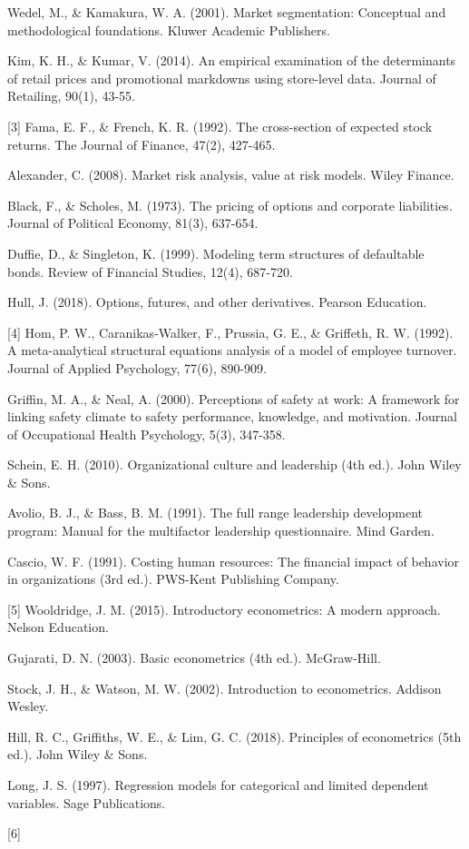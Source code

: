 \documentclass[
  letterpaper,
  DIV=11,
  numbers=noendperiod]{scrreport}
\begin{document}
Wedel, M., \& Kamakura, W. A. (2001). Market segmentation: Conceptual
and methodological foundations. Kluwer Academic Publishers.

Kim, K. H., \& Kumar, V. (2014). An empirical examination of the
determinants of retail prices and promotional markdowns using
store-level data. Journal of Retailing, 90(1), 43-55.

{[}3{]} Fama, E. F., \& French, K. R. (1992). The cross-section of
expected stock returns. The Journal of Finance, 47(2), 427-465.

Alexander, C. (2008). Market risk analysis, value at risk models. Wiley
Finance.

Black, F., \& Scholes, M. (1973). The pricing of options and corporate
liabilities. Journal of Political Economy, 81(3), 637-654.

Duffie, D., \& Singleton, K. (1999). Modeling term structures of
defaultable bonds. Review of Financial Studies, 12(4), 687-720.

Hull, J. (2018). Options, futures, and other derivatives. Pearson
Education.

{[}4{]} Hom, P. W., Caranikas-Walker, F., Prussia, G. E., \& Griffeth,
R. W. (1992). A meta-analytical structural equations analysis of a model
of employee turnover. Journal of Applied Psychology, 77(6), 890-909.

Griffin, M. A., \& Neal, A. (2000). Perceptions of safety at work: A
framework for linking safety climate to safety performance, knowledge,
and motivation. Journal of Occupational Health Psychology, 5(3),
347-358.

Schein, E. H. (2010). Organizational culture and leadership (4th ed.).
John Wiley \& Sons.

Avolio, B. J., \& Bass, B. M. (1991). The full range leadership
development program: Manual for the multifactor leadership
questionnaire. Mind Garden.

Cascio, W. F. (1991). Costing human resources: The financial impact of
behavior in organizations (3rd ed.). PWS-Kent Publishing Company.

{[}5{]} Wooldridge, J. M. (2015). Introductory econometrics: A modern
approach. Nelson Education.

Gujarati, D. N. (2003). Basic econometrics (4th ed.). McGraw-Hill.

Stock, J. H., \& Watson, M. W. (2002). Introduction to econometrics.
Addison Wesley.

Hill, R. C., Griffiths, W. E., \& Lim, G. C. (2018). Principles of
econometrics (5th ed.). John Wiley \& Sons.

Long, J. S. (1997). Regression models for categorical and limited
dependent variables. Sage Publications.

{[}6{]}
\end{document}
